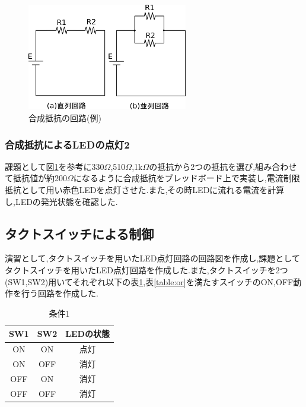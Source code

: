 \documentclass{jarticle}
\begin{document}
\begin{figure}[H]
\begin{center}
\includegraphics[width=7.0cm]{images/kairo.png}
\caption{合成抵抗の回路(例)}
\label{fig:gouseiteikou}
\end{center}
\end{figure}

\subsubsection{合成抵抗によるLEDの点灯2}
\label{subsubsec:gouseiled2}
課題として図\ref{fig:gouseiteikou}を参考に330$\Omega$,510$\Omega$,1k$\Omega$の抵抗から2つの抵抗を選び,組み合わせて抵抗値が約200$\Omega$になるように合成抵抗をブレッドボード上で実装し,電流制限抵抗として用い赤色LEDを点灯させた.また,その時LEDに流れる電流を計算し,LEDの発光状態を確認した.

\subsection{タクトスイッチによる制御}
\label{subsec:switch}
演習として,タクトスイッチを用いたLED点灯回路の回路図を作成し,課題としてタクトスイッチを用いたLED点灯回路を作成した.また,タクトスイッチを2つ(SW1,SW2)用いてそれぞれ以下の表\ref{table:and},表\ref{table:or}を満たすスイッチのON,OFF動作を行う回路を作成した.

\begin{table}[H]
\centering
\caption{条件1}
\label{table:and}
\begin{center}
\begin{tabular}{c|c|c}
\hline \hline
SW1 & SW2 & LEDの状態\\ \hline
ON & ON &点灯 \\
ON& OFF & 消灯 \\
OFF& ON& 消灯\\
OFF& OFF & 消灯\\ \hline
\end{tabular}
\end{center}
\end{table}
\end{document}
